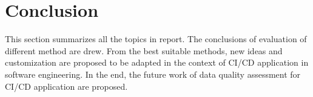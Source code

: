 \documentclass[pdftex,english,oribibl]{llncs}
\begin{document}
    \section{Conclusion}
    This section summarizes all the topics in report.
    The conclusions of evaluation of different method are drew.
    From the best suitable methods, new ideas and customization are proposed to be adapted in the context of CI/CD application in software engineering.
    In the end, the future work of data quality assessment for CI/CD application are proposed.
    
\end{document}
